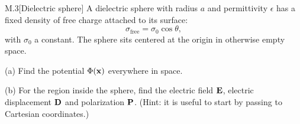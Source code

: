 \documentclass[12pt]{article}
\begin{document}
\newpage
\begin{problem}{M.3}[Dielectric sphere]
A dielectric sphere with radius $a$ and permittivity $\epsilon$ has a fixed
density of free charge attached to its surface:
\begin{equation}
    \sigma_{\text{free}}=\sigma_0\cos\theta, 
\end{equation}
with $\sigma_0$ a constant. The sphere sits centered at the origin in otherwise
empty space.

(a) Find the potential $\Phi(\vb{x})$ everywhere in space.

(b) For the region inside the sphere, find the electric field $\vb{E}$, electric
displacement $\vb{D}$ and polarization $\vb{P}$. (Hint: it is useful to start by
passing to Cartesian coordinates.)


\end{problem}
\end{document}
